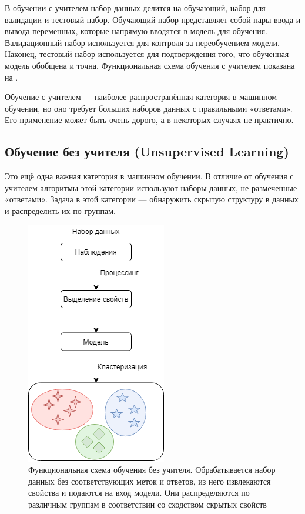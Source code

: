 В обучении с учителем набор данных делится на обучающий, набор для валидации и тестовый набор. Обучающий набор представляет собой пары ввода и вывода переменных, которые напрямую вводятся в модель для обучения. Валидационный набор используется для контроля за переобучением модели. Наконец, тестовый набор используется для подтверждения того, что обученная модель обобщена и точна. Функциональная схема обучения с учителем показана на .

Обучение с учителем --- наиболее распространённая категория в машинном обучении, но оно требует больших наборов данных с правильными «ответами». Его применение может быть очень дорого, а в некоторых случаях не практично.


\subsection{Обучение без учителя (Unsupervised Learning)}

Это ещё одна важная категория в машинном обучении.
В отличие от обучения с учителем алгоритмы этой категории используют наборы данных, не размеченные «ответами». Задача в этой категории --- обнаружить скрытую структуру в данных и распределить их по группам.

\begin{figure}[ht!]
	\center
	\includegraphics [scale=0.60] {my_folder/images/ch1/unsupervised-learning.png}
	\caption{Функциональная схема обучения без учителя. Обрабатывается набор данных без соответствующих меток и ответов, из него извлекаются свойства и подаются на вход модели. Они распределяются по различным группам в соответствии со сходством скрытых свойств}
	\label{fig:unsupervised-learning}
\end{figure}

